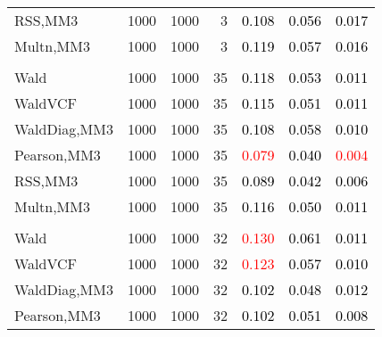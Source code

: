 \documentclass[
]{article}
\begin{document}
\begin{table}[H]
{\begin{tabular}[t]{lrrrrrr}
\hspace{1em}RSS,MM3 & 1000 & 1000 & 3 & \textcolor{black}{0.108} & \textcolor{black}{0.056} & \textcolor{black}{0.017}\\
\hspace{1em}Multn,MM3 & 1000 & 1000 & 3 & \textcolor{black}{0.119} & \textcolor{black}{0.057} & \textcolor{black}{0.016}\\
\addlinespace[0.3em]
\multicolumn{7}{l}{\textbf{1F 15V}}\\
\hspace{1em}Wald & 1000 & 1000 & 35 & \textcolor{black}{0.118} & \textcolor{black}{0.053} & \textcolor{black}{0.011}\\
\hspace{1em}WaldVCF & 1000 & 1000 & 35 & \textcolor{black}{0.115} & \textcolor{black}{0.051} & \textcolor{black}{0.011}\\
\hspace{1em}WaldDiag,MM3 & 1000 & 1000 & 35 & \textcolor{black}{0.108} & \textcolor{black}{0.058} & \textcolor{black}{0.010}\\
\hspace{1em}Pearson,MM3 & 1000 & 1000 & 35 & \textcolor{red}{0.079} & \textcolor{black}{0.040} & \textcolor{red}{0.004}\\
\hspace{1em}RSS,MM3 & 1000 & 1000 & 35 & \textcolor{black}{0.089} & \textcolor{black}{0.042} & \textcolor{black}{0.006}\\
\hspace{1em}Multn,MM3 & 1000 & 1000 & 35 & \textcolor{black}{0.116} & \textcolor{black}{0.050} & \textcolor{black}{0.011}\\
\addlinespace[0.3em]
\multicolumn{7}{l}{\textbf{2F 10V}}\\
\hspace{1em}Wald & 1000 & 1000 & 32 & \textcolor{red}{0.130} & \textcolor{black}{0.061} & \textcolor{black}{0.011}\\
\hspace{1em}WaldVCF & 1000 & 1000 & 32 & \textcolor{red}{0.123} & \textcolor{black}{0.057} & \textcolor{black}{0.010}\\
\hspace{1em}WaldDiag,MM3 & 1000 & 1000 & 32 & \textcolor{black}{0.102} & \textcolor{black}{0.048} & \textcolor{black}{0.012}\\
\hspace{1em}Pearson,MM3 & 1000 & 1000 & 32 & \textcolor{black}{0.102} & \textcolor{black}{0.051} & \textcolor{black}{0.008}\\

\end{tabular}}
\end{table}
\end{document}

